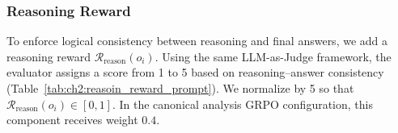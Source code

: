 \subsubsection*{Reasoning Reward}

To enforce logical consistency between reasoning and final answers, we add a reasoning reward $\mathcal{R}_{\text{reason}}(o_i)$. Using the same LLM-as-Judge framework, the evaluator assigns a score from 1 to 5 based on reasoning--answer consistency (Table~\ref{tab:ch2:reasoin_reward_prompt}). We normalize by 5 so that $\mathcal{R}_{\text{reason}}(o_i)\in[0,1]$. In the canonical analysis GRPO configuration, this component receives weight $0.4$.




